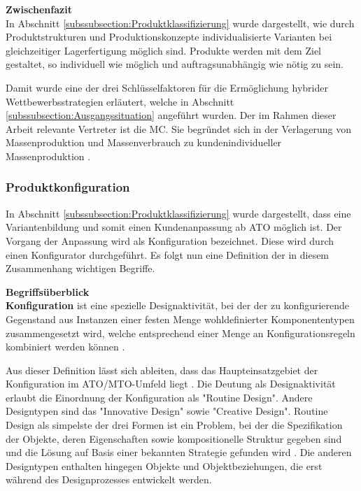 \documentclass[12pt,a4paper,bibliography=totocnumbered,listof=totoc]{scrartcl}
\begin{document}
\textbf{Zwischenfazit}\\
In Abschnitt \ref{subssubsection:Produktklassifizierung} wurde dargestellt, wie durch  Produktstrukturen und Produktionskonzepte individualisierte Varianten bei gleichzeitiger Lagerfertigung möglich sind. Produkte werden mit dem Ziel gestaltet, so individuell wie möglich und auftragsunabhängig wie nötig zu sein.

Damit wurde eine der drei Schlüsselfaktoren für die Ermöglichung hybrider Wettbewerbsstrategien erläutert, welche in Abschnitt \ref{subssubsection:Ausgangssituation} angeführt wurden. Der im Rahmen dieser Arbeit relevante Vertreter ist die \ac{MC}. Sie begründet sich in der Verlagerung von Massenproduktion und Massenverbrauch zu kundenindividueller Massenproduktion \citep{piller98}.

\subsubsection{Produktkonfiguration}
 \label{subssubsection:Produktkonfiguration}
 
In Abschnitt \ref{subssubsection:Produktklassifizierung} wurde dargestellt, dass eine Variantenbildung und somit einen Kundenanpassung ab \ac{ATO} möglich ist. Der Vorgang der Anpassung wird als Konfiguration bezeichnet. Diese wird durch einen Konfigurator durchgeführt.  Es folgt nun eine Definition der in diesem Zusammenhang wichtigen Begriffe.


\textbf{Begriffsüberblick}\\
\textbf{Konfiguration} ist eine spezielle Designaktivität, bei der der zu konfigurierende Gegenstand aus Instanzen einer festen Menge wohldefinierter Komponententypen zusammengesetzt wird, welche entsprechend einer Menge an Konfigurationsregeln kombiniert werden können \citep{sabin98}.

Aus dieser Definition lässt sich ableiten, dass das Haupteinsatzgebiet der Konfiguration im \ac{ATO}/\ac{MTO}-Umfeld liegt \citep{lutz11}. Die Deutung als Designaktivität erlaubt die Einordnung der Konfiguration als "Routine Design". Andere Designtypen sind das "Innovative Design" sowie "Creative Design". Routine Design als simpelste der drei Formen ist ein Problem, bei der die Spezifikation der Objekte, deren Eigenschaften sowie kompositionelle Struktur gegeben sind und die Lösung auf Basis einer bekannten Strategie gefunden wird \citep{brown89}. Die anderen Designtypen enthalten hingegen Objekte und Objektbeziehungen, die erst während des Designprozesses entwickelt werden.
\end{document}
